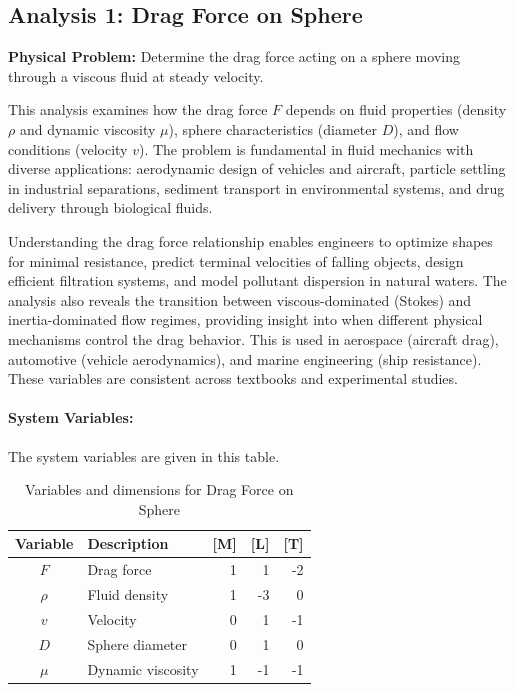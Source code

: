 \subsection{Analysis 1: Drag Force on Sphere}
\label{sec:Drag_Force_on_Sphere}

\begin{problembox}
\textbf{Physical Problem:} Determine the drag force acting on a sphere moving through a viscous fluid at steady velocity.
\end{problembox}

This analysis examines how the drag force $F$ depends on fluid properties (density $\rho$ and dynamic viscosity $\mu$), sphere characteristics (diameter $D$), and flow conditions (velocity $v$). The problem is fundamental in fluid mechanics with diverse applications: aerodynamic design of vehicles and aircraft, particle settling in industrial separations, sediment transport in environmental systems, and drug delivery through biological fluids.



Understanding the drag force relationship enables engineers to optimize shapes for minimal resistance, predict terminal velocities of falling objects, design efficient filtration systems, and model pollutant dispersion in natural waters. The analysis also reveals the transition between viscous-dominated (Stokes) and inertia-dominated flow regimes, providing insight into when different physical mechanisms control the drag behavior. This is used in aerospace (aircraft drag), automotive (vehicle aerodynamics), and marine engineering (ship resistance). These variables are consistent across textbooks and experimental studies.

\paragraph{System Variables: } The system variables are given in this table.

\begin{table}[H]
\centering
\begin{tabular}{|c|l|r|r|r|}
\hline
\textbf{Variable} & \textbf{Description} & \textbf{[M]} & \textbf{[L]} & \textbf{[T]} \\
\hline
$F$ & Drag force & 1 & 1 & -2 \\
$\rho$ & Fluid density & 1 & -3 & 0 \\
$v$ & Velocity & 0 & 1 & -1 \\
$D$ & Sphere diameter & 0 & 1 & 0 \\
$\mu$ & Dynamic viscosity & 1 & -1 & -1 \\

\hline
\end{tabular}
\caption{Variables and dimensions for Drag Force on Sphere}
\end{table}

